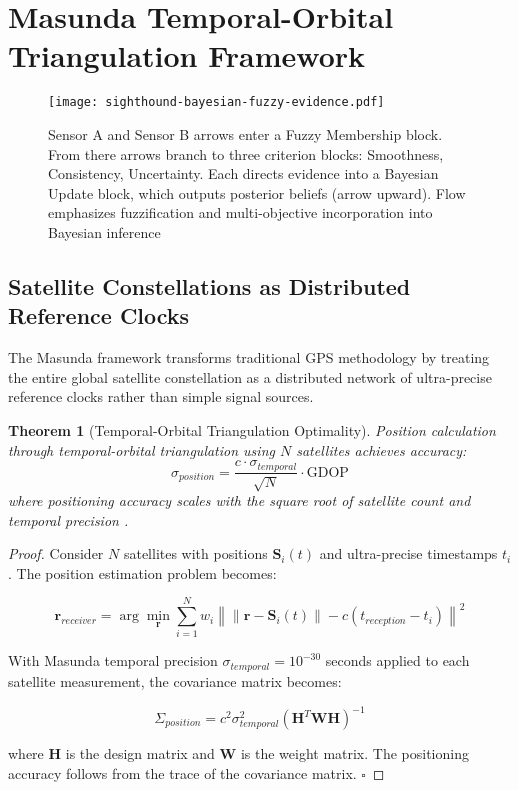 \documentclass[12pt,a4paper]{article}
\newtheorem{theorem}{Theorem}[section]
\begin{document}
\section{Masunda Temporal-Orbital Triangulation Framework}

\begin{figure}[H]
\centering
\texttt{[image: sighthound-bayesian-fuzzy-evidence.pdf]}
\caption{Sensor A and Sensor B arrows enter a Fuzzy Membership block. From there arrows branch to three criterion blocks: Smoothness, Consistency, Uncertainty. Each directs evidence into a Bayesian Update block, which outputs posterior beliefs (arrow upward). Flow emphasizes fuzzification and multi-objective incorporation into Bayesian inference}
\label{fig:sighthound-bayesian-fuzzy-evidence}
\end{figure}

\subsection{Satellite Constellations as Distributed Reference Clocks}

The Masunda framework transforms traditional GPS methodology by treating the entire global satellite constellation as a distributed network of ultra-precise reference clocks rather than simple signal sources.

\begin{theorem}[Temporal-Orbital Triangulation Optimality]
Position calculation through temporal-orbital triangulation using $N$ satellites achieves accuracy:
\begin{equation}
\sigma_{position} = \frac{c \cdot \sigma_{temporal}}{\sqrt{N}} \cdot \text{GDOP}
\end{equation}
where positioning accuracy scales with the square root of satellite count and temporal precision \cite{teunissen2017,hofmann2007}.
\end{theorem}

\begin{proof}
Consider $N$ satellites with positions $\mathbf{S}_i(t)$ and ultra-precise timestamps $t_i$. The position estimation problem becomes:

\begin{equation}
\mathbf{r}_{receiver} = \arg\min_{\mathbf{r}} \sum_{i=1}^{N} w_i \left\| \|\mathbf{r} - \mathbf{S}_i(t)\| - c(t_{reception} - t_i) \right\|^2
\end{equation}

With Masunda temporal precision $\sigma_{temporal} = 10^{-30}$ seconds applied to each satellite measurement, the covariance matrix becomes:

\begin{equation}
\Sigma_{position} = c^2 \sigma_{temporal}^2 (\mathbf{H}^T \mathbf{W} \mathbf{H})^{-1}
\end{equation}

where $\mathbf{H}$ is the design matrix and $\mathbf{W}$ is the weight matrix. The positioning accuracy follows from the trace of the covariance matrix. $\square$
\end{proof}
\end{document}
